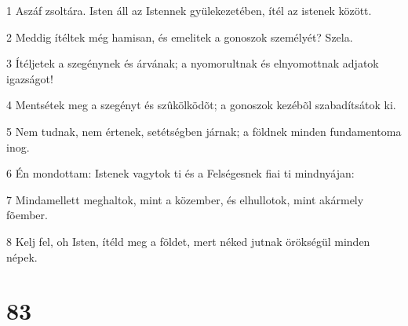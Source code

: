 \par 1 Aszáf zsoltára. Isten áll az Istennek gyülekezetében, ítél az istenek között.
\par 2 Meddig ítéltek még hamisan, és emelitek a gonoszok személyét? Szela.
\par 3 Ítéljetek a szegénynek és árvának; a nyomorultnak és elnyomottnak adjatok igazságot!
\par 4 Mentsétek meg a szegényt és szûkölködõt; a gonoszok kezébõl szabadítsátok ki.
\par 5 Nem tudnak, nem értenek, setétségben járnak; a földnek minden fundamentoma inog.
\par 6 Én mondottam: Istenek vagytok ti és a Felségesnek fiai ti mindnyájan:
\par 7 Mindamellett meghaltok, mint a közember, és elhullotok, mint akármely fõember.
\par 8 Kelj fel, oh Isten, ítéld meg a földet, mert néked jutnak örökségül minden népek.

\chapter{83}

